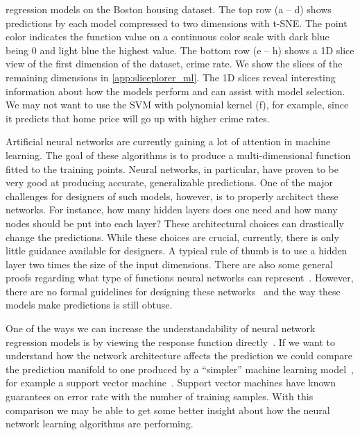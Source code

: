 \begin{figure*}[t]
{    regression models on the Boston housing dataset. The top row (a -- d) shows
    predictions by each model compressed to two dimensions with t-SNE. The
    point color indicates the function value on a
    continuous color scale with dark blue being 0 and
    light blue the highest value. The bottom row (e -- h) shows a 1D slice view
    of the first dimension of the dataset, crime rate. We show the slices of
    the remaining dimensions in \autoref{app:sliceplorer_ml}.
    The 1D slices reveal interesting information about how the models perform and
    can assist with model selection. We may not want to use the SVM with
    polynomial kernel (f), for example, since it predicts that home price will go
    up with higher crime rates.
  }
  \label{fig:nn_comp}
\end{figure*}

Artificial neural networks are currently gaining a lot of attention in machine
learning.  The goal of these algorithms is to produce a multi-dimensional
function fitted to the training points. Neural networks, in particular, have
proven to be very good at producing accurate, generalizable predictions. One of
the major challenges for designers of such models, however, is to properly
architect these networks. For instance, how many hidden layers does one need
and how many nodes should be put into each layer? These architectural choices
can drastically change the predictions.
While these choices are crucial, currently, there is only
little guidance available for designers. A typical rule of thumb is to
use a hidden layer two times the size of the input dimensions.
There are also some general proofs regarding what type of functions neural
networks can represent~\cite{Hornik:1989,Eldan:2016}. However, there are no
formal guidelines for designing these networks~\cite{Goodfellow:2016} and the
way these models make predictions is still obtuse.

One of the ways we can increase the understandability of neural network
regression models is by viewing the response function
directly~\cite{gleicher:2016}. If we want to understand how the network
architecture affects the prediction we could compare the prediction manifold to
one produced by a ``simpler'' machine learning model~\cite{Ribeiro:2016a}, for
example a support vector machine~\cite{Smola:2004}.  Support vector machines
have known guarantees on error rate with the number of training samples. With
this comparison we may be able to get some better insight about how the neural
network learning algorithms are performing.

